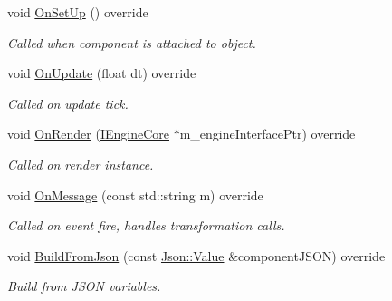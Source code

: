 \begin{DoxyCompactItemize}
void \mbox{\hyperlink{class_transform_component_a8c09c13555d6d480ef0e3af9e3231ae2}{On\+Set\+Up}} () override
\begin{DoxyCompactList}\small\item\em Called when component is attached to object. \end{DoxyCompactList}\item 
\mbox{\label{class_transform_component_ab763f5af77fcb5eee0e725c219901fa3}} 
void \mbox{\hyperlink{class_transform_component_ab763f5af77fcb5eee0e725c219901fa3}{On\+Update}} (float dt) override
\begin{DoxyCompactList}\small\item\em Called on update tick. \end{DoxyCompactList}\item 
\mbox{\label{class_transform_component_aaadf29ab1be89d21ac13b3e7e5030be8}} 
void \mbox{\hyperlink{class_transform_component_aaadf29ab1be89d21ac13b3e7e5030be8}{On\+Render}} (\mbox{\hyperlink{class_i_engine_core}{I\+Engine\+Core}} $\ast$m\+\_\+engine\+Interface\+Ptr) override
\begin{DoxyCompactList}\small\item\em Called on render instance. \end{DoxyCompactList}\item 
\mbox{\label{class_transform_component_ac250c4b7e47e639d0f8693d04c9b5051}} 
void \mbox{\hyperlink{class_transform_component_ac250c4b7e47e639d0f8693d04c9b5051}{On\+Message}} (const std\+::string m) override
\begin{DoxyCompactList}\small\item\em Called on event fire, handles transformation calls. \end{DoxyCompactList}\item 
\mbox{\label{class_transform_component_a4b1799af3b52257841775966452f231b}} 
void \mbox{\hyperlink{class_transform_component_a4b1799af3b52257841775966452f231b}{Build\+From\+Json}} (const \mbox{\hyperlink{class_json_1_1_value}{Json\+::\+Value}} \&component\+J\+S\+ON) override
\begin{DoxyCompactList}\small\item\em Build from J\+S\+ON variables. \end{DoxyCompactList}\item 

\end{DoxyCompactItemize}
